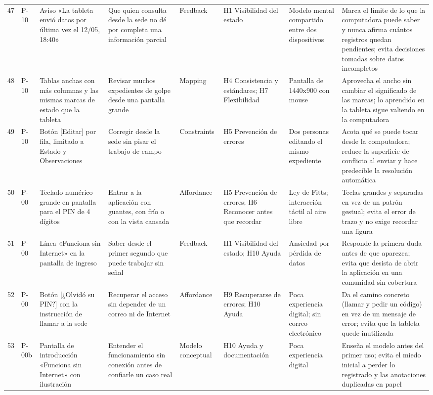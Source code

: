 \begin{longtable}{@{}p{0.6cm}p{1.5cm}p{3.6cm}p{3.4cm}p{2.2cm}p{2.8cm}p{2.3cm}p{4.6cm}@{}}
47 & P-10 & Aviso «La tableta envió datos por última vez el 12/05, 18:40» & Que quien consulta desde la sede no dé por completa una información parcial & Feedback & H1 Visibilidad del estado & Modelo mental compartido entre dos dispositivos & Marca el límite de lo que la computadora puede saber y nunca afirma cuántos registros quedan pendientes; evita decisiones tomadas sobre datos incompletos \\
48 & P-10 & Tablas anchas con más columnas y las mismas marcas de estado que la tableta & Revisar muchos expedientes de golpe desde una pantalla grande & Mapping & H4 Consistencia y estándares; H7 Flexibilidad & Pantalla de 1440x900 con mouse & Aprovecha el ancho sin cambiar el significado de las marcas; lo aprendido en la tableta sigue valiendo en la computadora \\
49 & P-10 & Botón [Editar] por fila, limitado a Estado y Observaciones & Corregir desde la sede sin pisar el trabajo de campo & Constraints & H5 Prevención de errores & Dos personas editando el mismo expediente & Acota qué se puede tocar desde la computadora; reduce la superficie de conflicto al enviar y hace predecible la resolución automática \\
50 & P-00 & Teclado numérico grande en pantalla para el PIN de 4 dígitos & Entrar a la aplicación con guantes, con frío o con la vista cansada & Affordance & H5 Prevención de errores; H6 Reconocer antes que recordar & Ley de Fitts; interacción táctil al aire libre & Teclas grandes y separadas en vez de un patrón gestual; evita el error de trazo y no exige recordar una figura \\
51 & P-00 & Línea «Funciona sin Internet» en la pantalla de ingreso & Saber desde el primer segundo que puede trabajar sin señal & Feedback & H1 Visibilidad del estado; H10 Ayuda & Ansiedad por pérdida de datos & Responde la primera duda antes de que aparezca; evita que desista de abrir la aplicación en una comunidad sin cobertura \\
52 & P-00 & Botón [¿Olvidó su PIN?] con la instrucción de llamar a la sede & Recuperar el acceso sin depender de un correo ni de Internet & Affordance & H9 Recuperarse de errores; H10 Ayuda & Poca experiencia digital; sin correo electrónico & Da el camino concreto (llamar y pedir un código) en vez de un mensaje de error; evita que la tableta quede inutilizada \\
53 & P-00b & Pantalla de introducción «Funciona sin Internet» con ilustración & Entender el funcionamiento sin conexión antes de confiarle un caso real & Modelo conceptual & H10 Ayuda y documentación & Poca experiencia digital & Enseña el modelo antes del primer uso; evita el miedo inicial a perder lo registrado y las anotaciones duplicadas en papel \\

\end{longtable}
